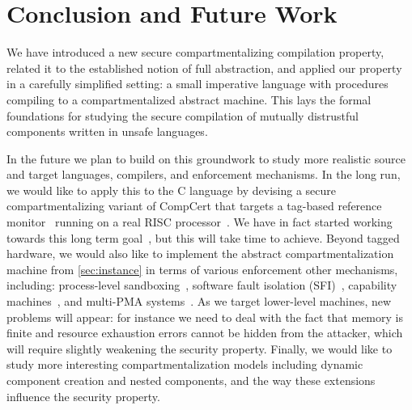 \documentclass[10pt, conference, compsocconf, letterpaper, times]{IEEEtran}
\begin{document}
\iffull
{}
\fi

\section{Conclusion and Future Work}
\label{sec:conclusion}

We have introduced a new secure compartmentalizing compilation property,
related it to the established notion of full abstraction,
and applied our property in a carefully simplified setting: a small
imperative language with procedures compiling to a compartmentalized
abstract machine.
This lays the formal foundations for studying the secure compilation
of mutually distrustful components written in unsafe languages.

In the future we plan to build on this groundwork to study more realistic
source and target languages, compilers, and enforcement mechanisms.
In the long run, we would like to apply this to the C language by
devising a secure compartmentalizing variant of CompCert that targets a
tag-based reference monitor~\cite{micropolicies2015} running on a real
RISC processor~\cite{Dover16}.
We have in fact started working towards this long term
goal~\cite{JuglaretHAPST15}, but this will take time to achieve.
Beyond tagged hardware, we would also like to implement the abstract
compartmentalization machine from \autoref{sec:instance} in terms of
various enforcement other mechanisms, including: process-level
sandboxing~\cite{Kilpatrick03, GudkaWACDLMNR15, wedge_nsdi2008,
  ProvosFH03}, software fault isolation (SFI)~\cite{YeeSDCMOONF10},
capability machines~\cite{cheri_oakland2015}, and multi-PMA
systems~\cite{PatrignaniDP16}.
As we target lower-level machines, new problems will appear: for
instance we need to deal with the fact that memory is finite and
resource exhaustion errors cannot be hidden from the attacker, which
will require slightly weakening the security property.
Finally, we would like to study more interesting compartmentalization
models including dynamic component creation and nested components, and
the way these extensions influence the security property.
\ifsooner
{}
\fi
\end{document}
